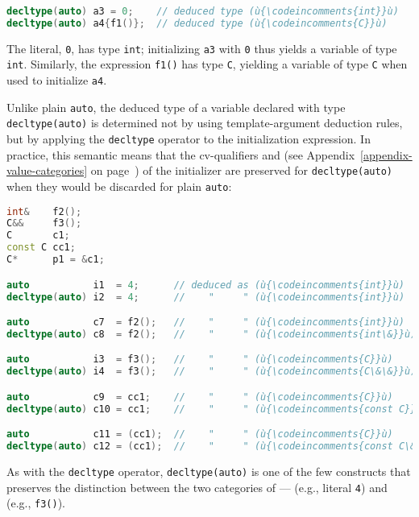 \begin{lstlisting}[language=C++]
decltype(auto) a3 = 0;    // deduced type (ù{\codeincomments{int}}ù)
decltype(auto) a4{f1()};  // deduced type (ù{\codeincomments{C}}ù)
\end{lstlisting}
    

The literal, \lstinline!0!, has type \lstinline!int!; initializing \lstinline!a3!
with \lstinline!0! thus yields a variable of type \lstinline!int!. Similarly,
the expression \lstinline!f1()! has type \lstinline!C!, yielding a variable of
type \lstinline!C! when used to initialize \lstinline!a4!.

Unlike plain \lstinline!auto!, the deduced type of a variable declared with
type \lstinline!decltype(auto)! is determined not by using
template-argument deduction rules, but by applying the \lstinline!decltype!
operator to the initialization expression. In practice, this semantic
means that the cv-qualifiers and  (see Appendix~\ref{appendix-value-categories} on page~\pageref{appendix-value-categories}) of the initializer are
preserved for \lstinline!decltype(auto)! when they would be discarded for
plain \lstinline!auto!:

\begin{lstlisting}[language=C++]
int&    f2();
C&&     f3();
C       c1;
const C cc1;
C*      p1 = &c1;

auto           i1  = 4;      // deduced as (ù{\codeincomments{int}}ù)
decltype(auto) i2  = 4;      //    "     " (ù{\codeincomments{int}}ù)

auto           c7  = f2();   //    "     " (ù{\codeincomments{int}}ù)
decltype(auto) c8  = f2();   //    "     " (ù{\codeincomments{int\&}}ù)

auto           i3  = f3();   //    "     " (ù{\codeincomments{C}}ù)
decltype(auto) i4  = f3();   //    "     " (ù{\codeincomments{C\&\&}}ù)

auto           c9  = cc1;    //    "     " (ù{\codeincomments{C}}ù)
decltype(auto) c10 = cc1;    //    "     " (ù{\codeincomments{const C}}ù)

auto           c11 = (cc1);  //    "     " (ù{\codeincomments{C}}ù)
decltype(auto) c12 = (cc1);  //    "     " (ù{\codeincomments{const C\&}}ù)
\end{lstlisting}
    

As with the \lstinline!decltype! operator, \lstinline!decltype(auto)! is one
of the few constructs that preserves the distinction between the two
categories of  ---  (e.g., literal
\lstinline!4!) and  (e.g., \lstinline!f3()!).

